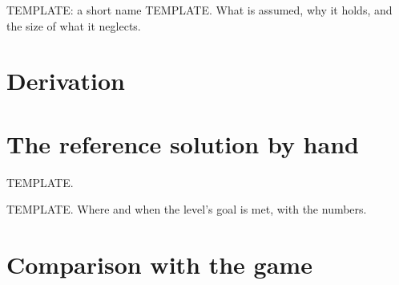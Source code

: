 \documentclass{leveldoc}
\begin{document}
\begin{assumption}{TEMPLATE: a short name}\label{as:first}
TEMPLATE. What is assumed, why it holds, and the size of what it neglects.
\end{assumption}

\section{Derivation}\label{sec:derivation}


\section{The reference solution by hand}\label{sec:hand}


\begin{procedure}
  \item\label{st:first} TEMPLATE.
\end{procedure}

\begin{result}
TEMPLATE. Where and when the level's goal is met, with the numbers.
\end{result}

\section{Comparison with the game}\label{sec:comparison}

\comparisontable

\end{document}

